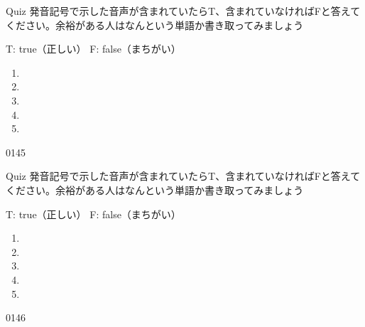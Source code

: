 \documentclass[aspectratio=169,xcolor={dvipsnames,table}]{beamer}
\begin{document}
\begin{frame}[plain]{Quiz }
\large
発音記号で示した音声が含まれていたらT、含まれていなければFと答えてください。余裕がある人はなんという単語か書き取ってみましょう

\hfill{}{\scriptsize T: true（正しい）\hspace{5pt} F: false（まちがい）}
 \begin{enumerate}
  \item \mbox{}\hspace{1\zw}
  \item \mbox{}\hspace{1\zw}
  \item \mbox{}\hspace{1\zw}
  \item \mbox{}\hspace{1\zw}
  \item \mbox{}\hspace{1\zw}
 \end{enumerate}

\hfill{\tiny 0145}\,{\scriptsize {}}

\end{frame}
\begin{frame}[plain]{Quiz}
\large
発音記号で示した音声が含まれていたらT、含まれていなければFと答えてください。余裕がある人はなんという単語か書き取ってみましょう

\hfill{}{\scriptsize T: true（正しい）\hspace{5pt} F: false（まちがい）}
 \begin{enumerate}
  \item \mbox{}\visible<2->{T}\hspace{1\zw}
  \item \mbox{}\hspace{1\zw}
  \item \mbox{}\hspace{1\zw}
  \item \mbox{}\visible<5->{F}\hspace{1\zw}
  \item \mbox{}\hspace{1\zw}
 \end{enumerate}

\hfill{\tiny 0146}\,{\scriptsize {}}
\end{frame}
\end{document}
